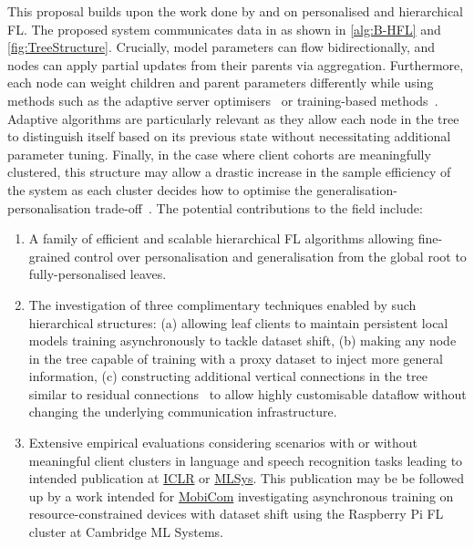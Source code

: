 This proposal builds upon the work done by \citet{EuroMLSysWorkshop} and \citet{OperaWorkshop} on personalised and hierarchical FL. The proposed system communicates data in as shown in \cref{alg:B-HFL} and \cref{fig:TreeStructure}. Crucially, model parameters can flow bidirectionally, and nodes can apply partial updates from their parents via aggregation. Furthermore, each node can weight children and parent parameters differently while using methods such as the adaptive server optimisers~\citep{FedOPT} or training-based methods~\citep{Ditto,EWC,DeepMutualLearning,PersonalisedFLFirstOrder}. Adaptive algorithms are particularly relevant as they allow each node in the tree to distinguish itself based on its previous state without necessitating additional parameter tuning. Finally, in the case where client cohorts are meaningfully clustered, this structure may allow a drastic increase in the sample efficiency of the system as each cluster decides how to optimise the generalisation-personalisation trade-off~\citep{PersonalisationGeneralisationTradeoff}. The potential contributions to the field include:
\begin{enumerate}
    \item A family of efficient and scalable hierarchical FL algorithms allowing fine-grained control over personalisation and generalisation from the global root to fully-personalised leaves.
    \item The investigation of three complimentary techniques enabled by such hierarchical structures: (a) allowing leaf clients to maintain persistent local models training asynchronously to tackle dataset shift, (b) making any node in the tree capable of training with a proxy dataset to inject more general information, (c) constructing additional vertical connections in the tree similar to residual connections~\citep{ResNet} to allow highly customisable dataflow without changing the underlying communication infrastructure.
    \item Extensive empirical evaluations considering scenarios with or without meaningful client clusters in language and speech recognition tasks leading to intended publication at \href{https://iclr.cc/}{ICLR} or \href{https://mlsys.org/}{MLSys}. This publication may be be followed up by a work intended for \href{https://sigmobile.org/mobicom/2023/}{MobiCom} investigating asynchronous training on resource-constrained devices with dataset shift using the Raspberry Pi FL cluster at Cambridge ML Systems.
\end{enumerate}









